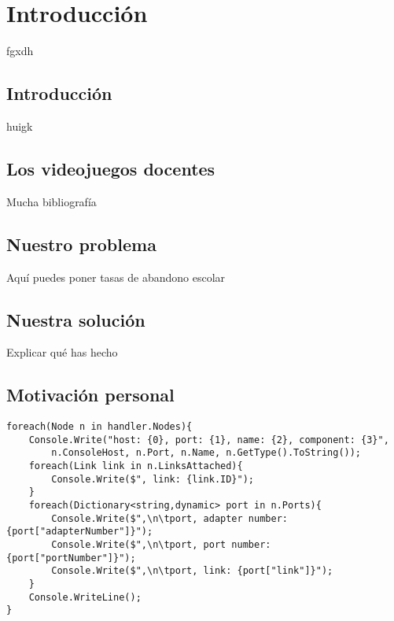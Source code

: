 \chapter{Introducción}\label{chap:Intro}

fgxdh

\section{Introducción}

huigk

\section{Los videojuegos docentes}

Mucha bibliografía

\section{Nuestro problema}

Aquí puedes poner tasas de abandono escolar

\section{Nuestra solución}

Explicar qué has hecho

\section{Motivación personal}

\begin{lstlisting}[language={[Sharp]C}, caption={C\# example}, label={Script}]
foreach(Node n in handler.Nodes){
	Console.Write("host: {0}, port: {1}, name: {2}, component: {3}",
		n.ConsoleHost, n.Port, n.Name, n.GetType().ToString());
	foreach(Link link in n.LinksAttached){
		Console.Write($", link: {link.ID}");
	}
	foreach(Dictionary<string,dynamic> port in n.Ports){
		Console.Write($",\n\tport, adapter number: {port["adapterNumber"]}");
		Console.Write($",\n\tport, port number: {port["portNumber"]}");
		Console.Write($",\n\tport, link: {port["link"]}");
	}
	Console.WriteLine();
}
\end{lstlisting}


